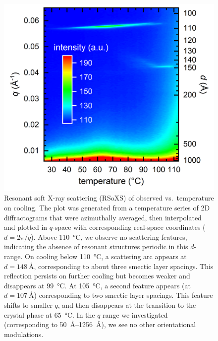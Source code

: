\documentclass[superscriptaddress,floatfix,onecolumn,notitlepage]{revtex4-1}
\begin{document}
\begin{figure}[H]
    \centering
    \includegraphics[width=.5\textwidth]{PAL30RSOXSshiftedTcontourplotv1mt.png}
    \caption{Resonant soft X-ray scattering (RSoXS) of  observed
        vs.\ temperature on
    cooling. The plot was generated
    from a temperature series of 2D diffractograms that were azimuthally
    averaged, then interpolated and plotted in $q$-space with corresponding real-space coordinates
    ($d=2\pi/q$). Above \SI{110}{\degreeCelsius}, we
    observe no scattering features, indicating the absence of resonant structures periodic in
    this $d$-range. On cooling below \SI{110}{\degreeCelsius}, a scattering arc
    appears at $d=\SI{148}{\angstrom}$, corresponding to  about three smectic layer
    spacings.
    This reflection persists on further cooling but becomes weaker and
    disappears
    at \SI{99}{\degreeCelsius}. At
    \SI{105}{\degreeCelsius}, a second feature appears (at $d =
    \SI{107}{\angstrom}$)
    corresponding to two smectic layer spacings. This feature
    shifts to smaller $q$, and then disappears at the transition to the
    crystal phase at \SI{65}{\degreeCelsius}. In the $q$ range we investigated
    (corresponding to \SIrange{50}{1256}{\angstrom}), we see no other orientational modulations.}
\end{figure}
\end{document}
